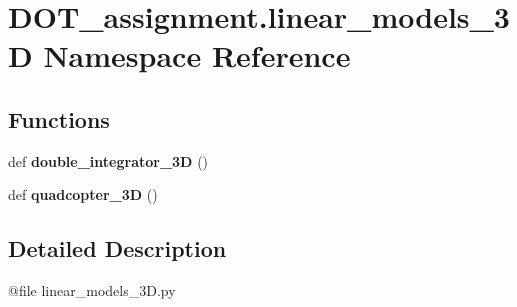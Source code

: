 \hypertarget{namespace_d_o_t__assignment_1_1linear__models__3_d}{}\section{D\+O\+T\+\_\+assignment.\+linear\+\_\+models\+\_\+3D Namespace Reference}
\label{namespace_d_o_t__assignment_1_1linear__models__3_d}
\subsection*{Functions}
\begin{DoxyCompactItemize}
\item 
\mbox{\label{namespace_d_o_t__assignment_1_1linear__models__3_d_a97530bcb089abdd4202d471a09533b50}} 
def {\bfseries double\+\_\+integrator\+\_\+3D} ()
\item 
\mbox{\label{namespace_d_o_t__assignment_1_1linear__models__3_d_a708de15afe4b64d16a4c08af673c26c9}} 
def {\bfseries quadcopter\+\_\+3D} ()
\end{DoxyCompactItemize}


\subsection{Detailed Description}
\begin{DoxyVerb}@file linear_models_3D.py
\end{DoxyVerb}
 